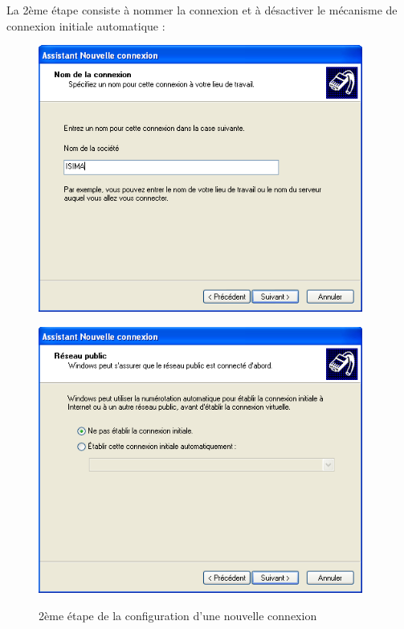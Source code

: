 La 2ème étape consiste à nommer la connexion et à désactiver le mécanisme de connexion initiale automatique :

\begin{figure}[H]
	\begin{minipage}{0.5\textwidth}
		\begin{flushleft} \large
			\includegraphics[width=0.95\textwidth]{partie_2/screen_windows/etape3.PNG}\\
		\end{flushleft}
	\end{minipage}
	\begin{minipage}{0.49\textwidth}
		\begin{flushright} \large
			\includegraphics[width=0.95\textwidth]{partie_2/screen_windows/etape4.PNG}\\
		\end{flushright}
	\end{minipage}
	\caption{2ème étape de la configuration d'une nouvelle connexion}
	\label{VPN_ETAPE2}
\end{figure}
~\


